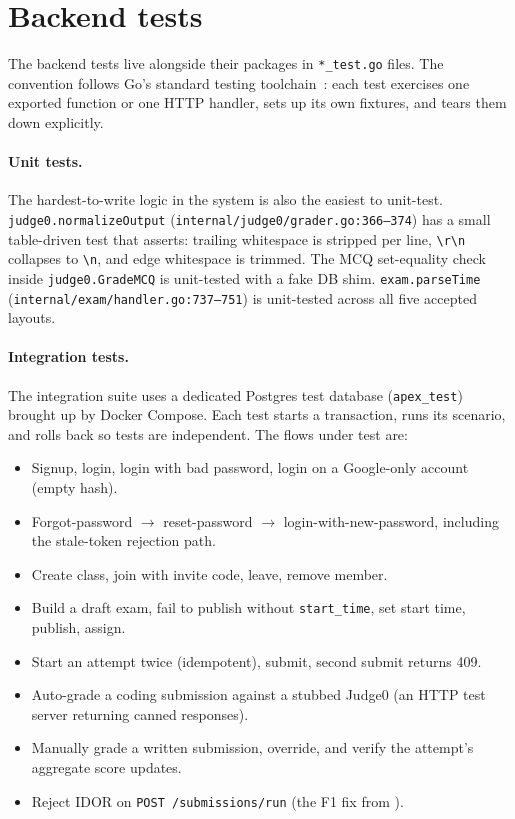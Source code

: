 \section{Backend tests}

The backend tests live alongside their packages in \texttt{*\_test.go} files. The convention follows Go's standard testing toolchain~\cite{go}: each test exercises one exported function or one HTTP handler, sets up its own fixtures, and tears them down explicitly.

\paragraph{Unit tests.} The hardest-to-write logic in the system is also the easiest to unit-test. \texttt{judge0.normalizeOutput} (\texttt{internal/judge0/grader.go:366--374}) has a small table-driven test that asserts: trailing whitespace is stripped per line, \texttt{\textbackslash r\textbackslash n} collapses to \texttt{\textbackslash n}, and edge whitespace is trimmed. The MCQ set-equality check inside \texttt{judge0.GradeMCQ} is unit-tested with a fake DB shim. \texttt{exam.parseTime} (\texttt{internal/exam/handler.go:737--751}) is unit-tested across all five accepted layouts.

\paragraph{Integration tests.} The integration suite uses a dedicated Postgres test database (\texttt{apex\_test}) brought up by Docker Compose. Each test starts a transaction, runs its scenario, and rolls back so tests are independent. The flows under test are:

\begin{itemize}
  \item Signup, login, login with bad password, login on a Google-only account (empty hash).
  \item Forgot-password $\to$ reset-password $\to$ login-with-new-password, including the stale-token rejection path.
  \item Create class, join with invite code, leave, remove member.
  \item Build a draft exam, fail to publish without \texttt{start\_time}, set start time, publish, assign.
  \item Start an attempt twice (idempotent), submit, second submit returns 409.
  \item Auto-grade a coding submission against a stubbed Judge0 (an HTTP test server returning canned responses).
  \item Manually grade a written submission, override, and verify the attempt's aggregate score updates.
  \item Reject IDOR on \texttt{POST /submissions/run} (the F1 fix from ).
\end{itemize}

